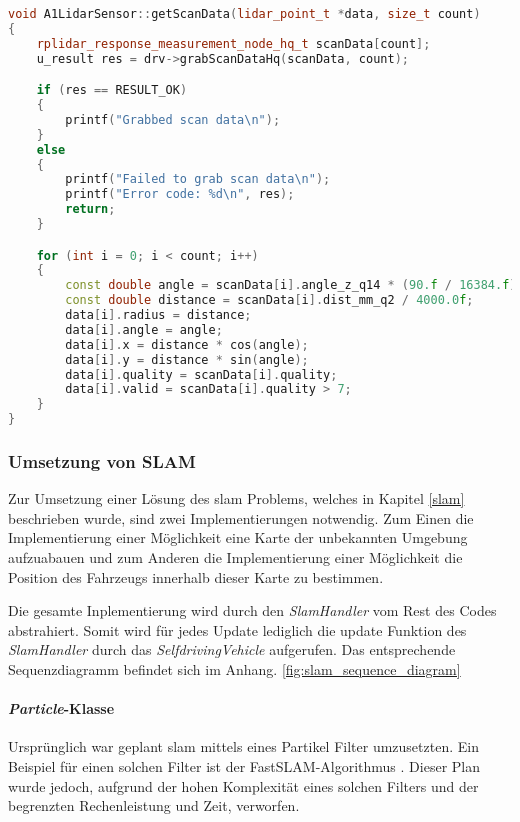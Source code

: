 \begin{lstlisting}[caption={Auslesen der LiDAR Daten},label={lst:auslesen_lidar},language={C++}]
void A1LidarSensor::getScanData(lidar_point_t *data, size_t count)
{
    rplidar_response_measurement_node_hq_t scanData[count];
    u_result res = drv->grabScanDataHq(scanData, count);

    if (res == RESULT_OK)
    {
        printf("Grabbed scan data\n");
    }
    else
    {
        printf("Failed to grab scan data\n");
        printf("Error code: %d\n", res);
        return;
    }

    for (int i = 0; i < count; i++)
    {
        const double angle = scanData[i].angle_z_q14 * (90.f / 16384.f);
        const double distance = scanData[i].dist_mm_q2 / 4000.0f;
        data[i].radius = distance;
        data[i].angle = angle;
        data[i].x = distance * cos(angle);
        data[i].y = distance * sin(angle);
        data[i].quality = scanData[i].quality;
        data[i].valid = scanData[i].quality > 7;
    }
}
\end{lstlisting}

\subsubsection{Umsetzung von SLAM}
\label{slamImplementierung}

Zur Umsetzung einer Lösung des \ac{slam} Problems, welches in Kapitel \ref{slam} beschrieben wurde, sind zwei Implementierungen notwendig.
Zum Einen die Implementierung einer Möglichkeit eine Karte der unbekannten Umgebung aufzuabauen 
und zum Anderen die Implementierung einer Möglichkeit die Position des Fahrzeugs innerhalb dieser Karte zu bestimmen.

Die gesamte Inplementierung wird durch den \textit{SlamHandler} vom Rest des Codes abstrahiert.
Somit wird für jedes Update lediglich die update Funktion des \textit{SlamHandler} durch das \textit{SelfdrivingVehicle} aufgerufen.
Das entsprechende Sequenzdiagramm befindet sich im Anhang. \ref{fig:slam_sequence_diagram}

\paragraph{\textit{Particle}-Klasse} \mbox{}
Ursprünglich war geplant \ac{slam} mittels eines Partikel Filter umzusetzten.
Ein Beispiel für einen solchen Filter ist der FastSLAM-Algorithmus \cite{montemerlo2002fastslam}.
Dieser Plan wurde jedoch, aufgrund der hohen Komplexität eines solchen Filters und der begrenzten Rechenleistung und Zeit, verworfen.


